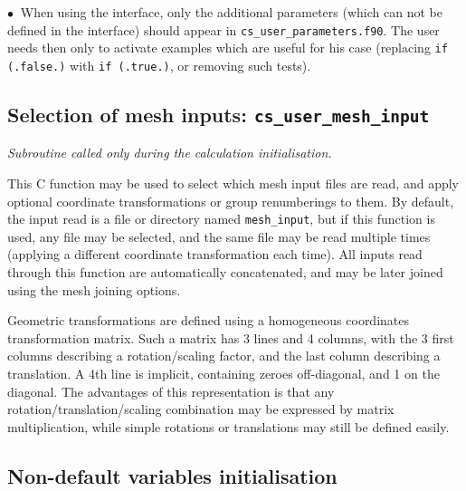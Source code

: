 {{\noindent
$\bullet\ $ When using the interface, only the
additional parameters (which can not be defined in the interface)
should appear in \texttt{cs\_user\_parameters.f90}. The user
needs then only to activate examples which are useful for his
case (replacing \texttt{if (.false.)} with \texttt{if (.true.)},
or removing such tests).

\subsection{Selection of mesh inputs: \textmd{\texttt{cs\_user\_mesh\_input}}}

\noindent
\textit{Subroutine called only during the calculation initialisation.}

This C function may be used to select which mesh input files
are read, and apply optional coordinate transformations or group renumberings
to them. By default, the input read is a file or directory named
\texttt{mesh\_input}, but if this function is used, any file may be selected,
and the same file may be read multiple times (applying a different
coordinate transformation each time).
All inputs read through this function are automatically concatenated, and
may be later joined using the mesh joining options.

Geometric transformations are defined using a homogeneous coordinates
transformation matrix. Such a matrix has 3 lines and 4 columns, with the
3 first columns describing a rotation/scaling factor, and the last column
describing a translation. A 4th line is implicit, containing zeroes
off-diagonal, and 1 on the diagonal. The advantages of this representation
is that any rotation/translation/scaling combination may be expressed
by matrix multiplication, while simple rotations or translations
may still be defined easily.

\subsection{Non-default variables initialisation} \label{sec:cs_user_initialization}

}}
